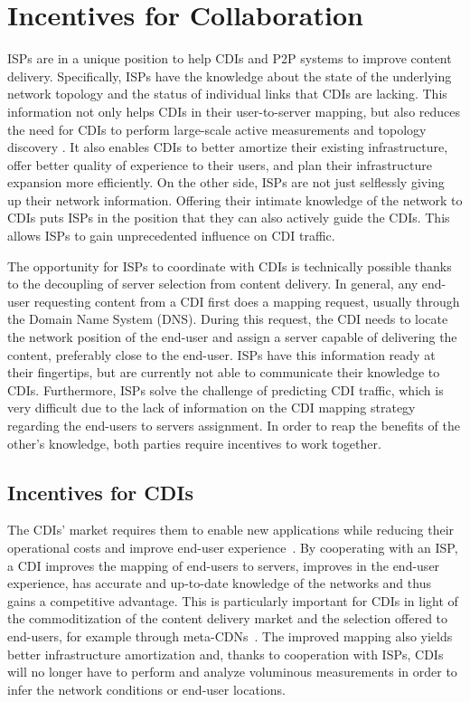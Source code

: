 \section{Incentives for Collaboration}\label{sec:Incentives}

ISPs are in a unique position to help CDIs and P2P systems to improve content
delivery.  Specifically, ISPs have the knowledge about the state of the
underlying network topology and the status of individual links that CDIs are
lacking. This information not only helps CDIs in their user-to-server mapping,
but also reduces the need for CDIs to perform large-scale active measurements
and topology discovery \cite{sureroute}.  It also enables CDIs to better
amortize their existing infrastructure, offer better quality of experience to
their users, and plan their infrastructure expansion more efficiently. On the
other side, ISPs are not just selflessly giving up their network information.
Offering their intimate knowledge of the network to CDIs puts ISPs in the
position that they can also actively guide the CDIs. This allows ISPs to gain
unprecedented influence on CDI traffic.

The opportunity for ISPs to coordinate with CDIs is technically possible
thanks to the decoupling of server selection from content delivery. In general,
any end-user requesting content from a CDI first does a mapping request,
usually through the Domain Name System (DNS). During this request, the CDI
needs to locate the network position of the end-user and assign a server
capable of delivering the content, preferably close to the end-user.  ISPs have
this information ready at their fingertips, but are currently not able to
communicate their knowledge to CDIs. Furthermore, ISPs solve the challenge of
predicting CDI traffic, which is very difficult due to the lack of information
on the CDI mapping strategy regarding the end-users to servers assignment. In
order to reap the benefits of the other's knowledge, both parties require
incentives to work together.

\subsection{Incentives for CDIs}

The CDIs' market requires them to enable new applications while reducing
their operational costs and improve end-user experience~\cite{Akamai-Network}.
By cooperating with an ISP, a CDI improves the mapping of end-users to servers,
improves in the end-user experience, has accurate and up-to-date knowledge of
the networks and thus gains a competitive advantage. This is particularly
important for CDIs in light of the commoditization of the content delivery
market and the selection offered to end-users, for example through
meta-CDNs~\cite{Conviva2011}. The improved mapping also yields better
infrastructure amortization and, thanks to cooperation with ISPs, CDIs will no
longer have to perform and analyze voluminous measurements in order to infer
the network conditions or end-user locations.


